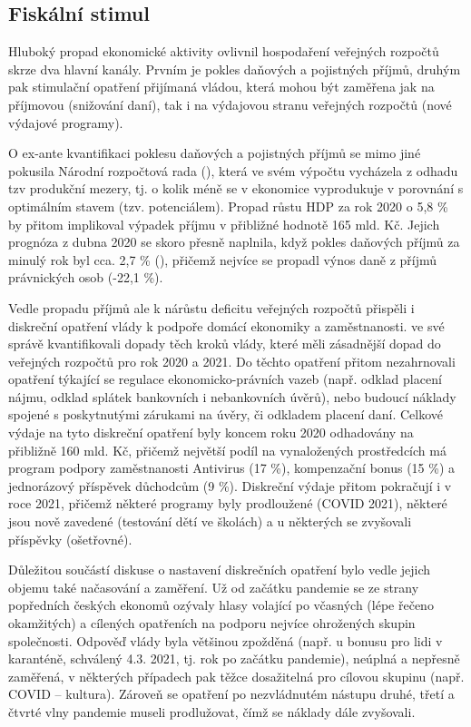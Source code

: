 \subsection*{Fiskální stimul} 
Hluboký propad ekonomické aktivity ovlivnil hospodaření veřejných rozpočtů skrze dva hlavní kanály. Prvním je pokles daňových a pojistných příjmů, druhým pak stimulační opatření přijímaná vládou, která mohou být zaměřena jak na příjmovou (snižování daní), tak i na výdajovou stranu veřejných rozpočtů (nové výdajové programy). 

O ex-ante kvantifikaci poklesu daňových a pojistných příjmů se mimo jiné pokusila Národní rozpočtová rada (\cite{Hlavacek2020}), která ve svém výpočtu vycházela z odhadu tzv produkční mezery, tj. o kolik méně se v ekonomice vyprodukuje v porovnání s optimálním stavem (tzv. potenciálem). Propad růstu HDP za rok 2020 o 5,8 \% by přitom implikoval výpadek příjmu v přibližné hodnotě 165 mld. Kč. Jejich prognóza z dubna 2020 se skoro přesně naplnila, když pokles daňových příjmů za minulý rok byl cca. 2,7 \% (\cite{MFCR2021}), přičemž nejvíce se propadl výnos daně z příjmů právnických osob (-22,1 \%).

Vedle propadu příjmů ale k nárůstu deficitu veřejných rozpočtů přispěli i diskreční opatření vlády k podpoře domácí ekonomiky a zaměstnanosti. \cite{Hlavacek2020} ve své správě kvantifikovali dopady těch kroků vlády, které měli zásadnější dopad do veřejných rozpočtů pro rok 2020 a 2021. Do těchto opatření přitom nezahrnovali opatření týkající se regulace ekonomicko-právních vazeb (např. odklad placení nájmu, odklad splátek bankovních i nebankovních úvěrů), nebo budoucí náklady spojené s poskytnutými zárukami na úvěry, či odkladem placení daní. Celkové výdaje na tyto diskreční opatření byly koncem roku 2020 odhadovány na přibližně 160 mld. Kč, přičemž největší podíl na vynaložených prostředcích má program podpory zaměstnanosti Antivirus (17 \%), kompenzační bonus (15 \%) a jednorázový příspěvek důchodcům (9 \%). Diskreční výdaje přitom pokračují i v roce 2021, přičemž některé programy byly prodloužené (COVID 2021), některé jsou nově zavedené (testování dětí ve školách) a u některých se zvyšovali příspěvky (ošetřovné).

Důležitou součástí diskuse o nastavení diskrečních opatření bylo vedle jejich objemu také načasování a zaměření. Už od začátku pandemie se ze strany popředních českých ekonomů ozývaly hlasy volající po včasných (lépe řečeno okamžitých) a cílených opatřeních na podporu nejvíce ohrožených skupin spo\-le\-čno\-sti. Odpověď vlády byla většinou zpožděná (např. u bonusu pro lidi v karanténě, schválený 4.3. 2021, tj. rok po začátku pandemie), neúplná a nepřesně zaměřená, v některých případech pak těžce dosažitelná pro cílovou skupinu (např. COVID – kultura). Zároveň se opatření po nezvládnutém nástupu druhé, třetí a čtvrté vlny pandemie museli prodlužovat, čímž se náklady dále zvyšovali.

